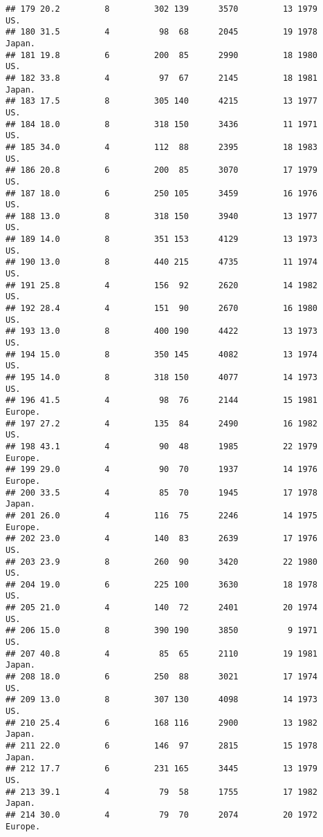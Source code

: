 \documentclass[11pt,]{article}
\begin{document}
\begin{verbatim}
## 179 20.2         8         302 139      3570         13 1979      US.
## 180 31.5         4          98  68      2045         19 1978   Japan.
## 181 19.8         6         200  85      2990         18 1980      US.
## 182 33.8         4          97  67      2145         18 1981   Japan.
## 183 17.5         8         305 140      4215         13 1977      US.
## 184 18.0         8         318 150      3436         11 1971      US.
## 185 34.0         4         112  88      2395         18 1983      US.
## 186 20.8         6         200  85      3070         17 1979      US.
## 187 18.0         6         250 105      3459         16 1976      US.
## 188 13.0         8         318 150      3940         13 1977      US.
## 189 14.0         8         351 153      4129         13 1973      US.
## 190 13.0         8         440 215      4735         11 1974      US.
## 191 25.8         4         156  92      2620         14 1982      US.
## 192 28.4         4         151  90      2670         16 1980      US.
## 193 13.0         8         400 190      4422         13 1973      US.
## 194 15.0         8         350 145      4082         13 1974      US.
## 195 14.0         8         318 150      4077         14 1973      US.
## 196 41.5         4          98  76      2144         15 1981  Europe.
## 197 27.2         4         135  84      2490         16 1982      US.
## 198 43.1         4          90  48      1985         22 1979  Europe.
## 199 29.0         4          90  70      1937         14 1976  Europe.
## 200 33.5         4          85  70      1945         17 1978   Japan.
## 201 26.0         4         116  75      2246         14 1975  Europe.
## 202 23.0         4         140  83      2639         17 1976      US.
## 203 23.9         8         260  90      3420         22 1980      US.
## 204 19.0         6         225 100      3630         18 1978      US.
## 205 21.0         4         140  72      2401         20 1974      US.
## 206 15.0         8         390 190      3850          9 1971      US.
## 207 40.8         4          85  65      2110         19 1981   Japan.
## 208 18.0         6         250  88      3021         17 1974      US.
## 209 13.0         8         307 130      4098         14 1973      US.
## 210 25.4         6         168 116      2900         13 1982   Japan.
## 211 22.0         6         146  97      2815         15 1978   Japan.
## 212 17.7         6         231 165      3445         13 1979      US.
## 213 39.1         4          79  58      1755         17 1982   Japan.
## 214 30.0         4          79  70      2074         20 1972  Europe.

\end{verbatim}
\end{document}
